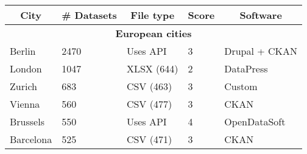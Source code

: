 \begin{table}[!ht]
  \onehalfspacing
  \centering
  \begin{tabular}{|lllll|}
    \hline
    \multicolumn{1}{|c|}{\textbf{City}} & \multicolumn{1}{c|}{\textbf{\# Datasets}} & \multicolumn{1}{c|}{\textbf{File type}} & \multicolumn{1}{c|}{\textbf{Score}} & \multicolumn{1}{c|}{\textbf{Software}} \\ \hline
    \multicolumn{5}{|c|}{\textbf{European cities}}    \\ \hline
    \multicolumn{1}{|l|}{Berlin}                      & \multicolumn{1}{|l|}{2470}                                             & \multicolumn{1}{|l|}{Uses \acs{API}}                                                  & \multicolumn{1}{|l|}{3}        & \multicolumn{1}{|l|}{Drupal + CKAN}                                   \\ \hline
    \multicolumn{1}{|l|}{London}                      & \multicolumn{1}{|l|}{1047}                                             & \multicolumn{1}{|l|}{XLSX (644)}                                                      & \multicolumn{1}{|l|}{2}        & \multicolumn{1}{|l|}{DataPress}                                   \\ \hline
    \multicolumn{1}{|l|}{Zurich}                      & \multicolumn{1}{|l|}{683}                                              & \multicolumn{1}{|l|}{CSV (463)}                                                       & \multicolumn{1}{|l|}{3}        & \multicolumn{1}{|l|}{Custom}                                   \\ \hline
    \multicolumn{1}{|l|}{Vienna}                      & \multicolumn{1}{|l|}{560}                                              & \multicolumn{1}{|l|}{CSV (477)}                                                       & \multicolumn{1}{|l|}{3}        & \multicolumn{1}{|l|}{CKAN}                                   \\ \hline
    \multicolumn{1}{|l|}{Brussels}                   & \multicolumn{1}{|l|}{550}                                              & \multicolumn{1}{|l|}{Uses \acs{API}}                                                  & \multicolumn{1}{|l|}{4}        & \multicolumn{1}{|l|}{OpenDataSoft}                                   \\ \hline
    \multicolumn{1}{|l|}{Barcelona}                   & \multicolumn{1}{|l|}{525}                                              & \multicolumn{1}{|l|}{CSV (471)}                                                       & \multicolumn{1}{|l|}{3}        & \multicolumn{1}{|l|}{CKAN}                                   \\ \hline

\end{tabular}
\end{table}
